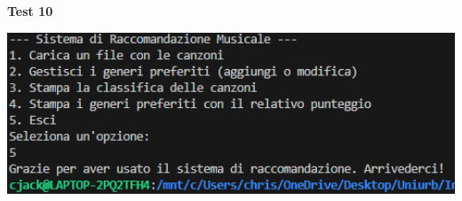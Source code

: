 \documentclass[a4paper,11pt]{article}
\begin{document}
\begin{center}
    \textbf{Test 10}
    \par
    \vspace{0.5cm}
    \includegraphics[width=1\textwidth]{htest10}
\end{center}
\vspace{1cm}

\newpage
\end{document}
